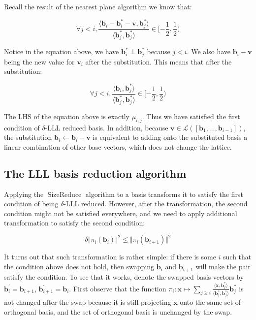 Recall the result of the nearest plane algorithm we know that:

$$
\forall j < i,
\frac{
    \langle
        \mathbf{b}_i - \mathbf{b}_i^\ast - \mathbf{v}, \mathbf{b}_j^\ast
    \rangle
}{
    \langle 
        \mathbf{b}_j^\ast, \mathbf{b}_j^\ast
    \rangle
} \in [-\frac{1}{2}, \frac{1}{2})
$$

Notice in the equation above, we have $\mathbf{b}_i^\ast \perp \mathbf{b}_j^\ast$ because $j < i$. We also have $\mathbf{b}_i - \mathbf{v}$ being the new value for $\mathbf{v}_i$ after the substitution. This means that after the substitution:

$$
\forall j < i,
\frac{
    \langle
        \mathbf{b}_i, \mathbf{b}_j^\ast
    \rangle
}{
    \langle
        \mathbf{b}_j^\ast, \mathbf{b}_j^\ast
    \rangle
} \in [-\frac{1}{2}, \frac{1}{2})
$$

The LHS of the equation above is exactly $\mu_{i,j}$. Thus we have satisfied the first condition of $\delta$-LLL reduced basis. In addition, because $\mathbf{v} \in \mathcal{L}([\mathbf{b}_1, \ldots, \mathbf{b}_{i-1}])$, the substitution $\mathbf{b}_i \leftarrow \mathbf{b}_i - \mathbf{v}$ is equivalent to adding onto the substituted basis a linear combination of other base vectors, which does not change the lattice.

\subsection{The LLL basis reduction algorithm}\label{subsec:lllreduce}
Applying the $\operatorname{SizeReduce}$ algorithm to a basis transforms it to satisfy the first condition of being $\delta$-LLL reduced. However, after the transformation, the second condition might not be satisfied everywhere, and we need to apply additional transformation to satisfy the second condition:

$$
\delta \Vert \pi_i(\mathbf{b}_i) \Vert^2 \leq \Vert \pi_i(\mathbf{b}_{i+1})\Vert^2
$$

It turns out that such transformation is rather simple: if there is some $i$ such that the condition above does not hold, then swapping $\mathbf{b}_i$ and $\mathbf{b}_{i+1}$ will make the pair satisfy the condition. To see that it works, denote the swapped basis vectors by $\mathbf{b}_i^\prime = \mathbf{b}_{i+1}$, $\mathbf{b}_{i+1}^\prime = \mathbf{b}_{i}$. First observe that the function $\pi_i: \mathbf{x} \mapsto \sum_{j\geq i}\frac{\langle \mathbf{x}, \mathbf{b}_j^\ast \rangle}{\langle \mathbf{b}_j^\ast, \mathbf{b}_j^\ast \rangle}\mathbf{b}_j^\ast$ is not changed after the swap because it is still projecting $\mathbf{x}$ onto the same set of orthogonal basis, and the set of orthogonal basis is unchanged by the swap.

